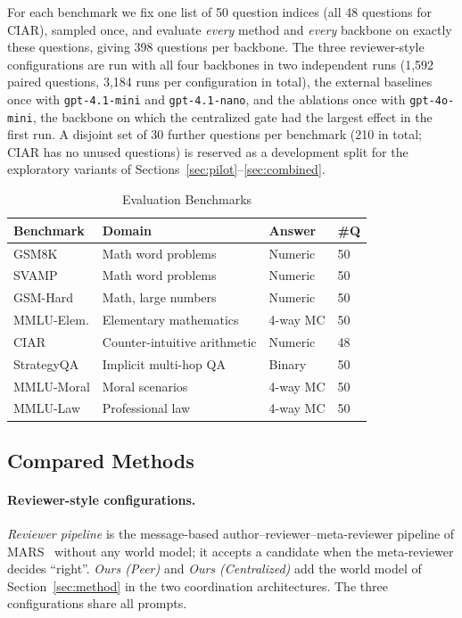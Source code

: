 For each benchmark we fix one list of 50 question indices (all 48 questions for CIAR), sampled once, and evaluate \emph{every} method and \emph{every} backbone on exactly these questions, giving 398 questions per backbone.
The three reviewer-style configurations are run with all four backbones in two independent runs (1{,}592 paired questions, 3{,}184 runs per configuration in total), the external baselines once with \texttt{gpt-4.1-mini} and \texttt{gpt-4.1-nano}, and the ablations once with \texttt{gpt-4o-mini}, the backbone on which the centralized gate had the largest effect in the first run.
A disjoint set of 30 further questions per benchmark (210 in total; CIAR has no unused questions) is reserved as a development split for the exploratory variants of Sections~\ref{sec:pilot}--\ref{sec:combined}.

\begin{table}[!t]
\caption{Evaluation Benchmarks}
\label{tab:dataset_overview}
\centering
\footnotesize
\setlength{\tabcolsep}{3pt}
\begin{tabular}{llll}
\toprule
Benchmark & Domain & Answer & \#Q \\
\midrule
GSM8K & Math word problems & Numeric & 50 \\
SVAMP & Math word problems & Numeric & 50 \\
GSM-Hard & Math, large numbers & Numeric & 50 \\
MMLU-Elem. & Elementary mathematics & 4-way MC & 50 \\
CIAR & Counter-intuitive arithmetic & Numeric & 48 \\
StrategyQA & Implicit multi-hop QA & Binary & 50 \\
MMLU-Moral & Moral scenarios & 4-way MC & 50 \\
MMLU-Law & Professional law & 4-way MC & 50 \\
\bottomrule
\end{tabular}
\end{table}

\subsection{Compared Methods}

\paragraph{Reviewer-style configurations.}
\emph{Reviewer pipeline} is the message-based author--reviewer--meta-reviewer pipeline of MARS~\cite{wang2025mars} without any world model; it accepts a candidate when the meta-reviewer decides ``right''.
\emph{Ours (Peer)} and \emph{Ours (Centralized)} add the world model of Section~\ref{sec:method} in the two coordination architectures.
The three configurations share all prompts.


